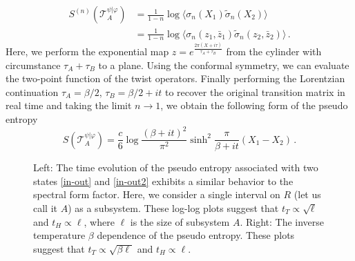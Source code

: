 \documentclass[%
twocolumn, 
secnumarabic,amssymb, preprintnumbers, superscriptaddress, aps, prl]{revtex4-1}
\begin{document}
\begin{align}
S^{(n)}(\mathcal{T}^{\psi|\varphi}_A)&=\frac{1}{1-n}\log\langle \sigma_n(X_1)\tilde{\sigma}_n(X_2)\rangle\\ \nonumber
&=\frac{1}{1-n}\log\langle \sigma_n(z_1,\bar{z}_1)\tilde{\sigma}_n(z_2,\bar{z}_2)\rangle\, .
\end{align}
Here, we perform the exponential map $z=e^{\frac{2\pi(X+i\tau)}{\tau_A+\tau_B}}$  from the cylinder with circumstance $\tau_A+\tau_B$ to a plane.
Using the conformal symmetry, %
  we can evaluate the two-point function of the twist operators. Finally performing the Lorentzian continuation $\tau_A=\beta/2$, $\tau_B=\beta/2+it$ to recover the original transition matrix in real time and taking the limit $n\rightarrow 1$, we obtain the following form of the pseudo entropy
\begin{equation}\label{pseudo}
    S(\mathcal{T}^{\psi|\varphi}_A)=\frac{c}{6}\log \frac{(\beta+it)^2}{\pi^2}\sinh^2\frac{\pi}{\beta+i t}(X_1-X_2)\, .
    \end{equation}

\begin{figure}
 \begin{center}
  \;
 \end{center}
 \caption{Left: The time evolution of the pseudo entropy associated with two states \eqref{in-out} and \eqref{in-out2} exhibits a similar behavior to the spectral form factor. Here, we consider a single interval on $R$ (let us call it $A$) as a subsystem. These log-log plots suggest that $t_T\propto\sqrt{\ell}$ and $t_H\propto\ell$, where $\ell$ is the size of subsystem $A$. Right: The inverse temperature $\beta$ dependence of the pseudo entropy. These plots  suggest that $t_T\propto\sqrt{\beta\ell}$ and $t_H\propto\ell$.}
 \label{fig:pe1}
\end{figure}
\end{document}

